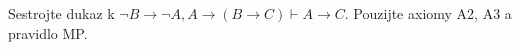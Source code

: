 \subsubsection{}
Sestrojte dukaz k $\neg B \to \neg A, A \to (B \to C) \vdash A \to C$.
Pouzijte axiomy A2, A3 a pravidlo MP.
